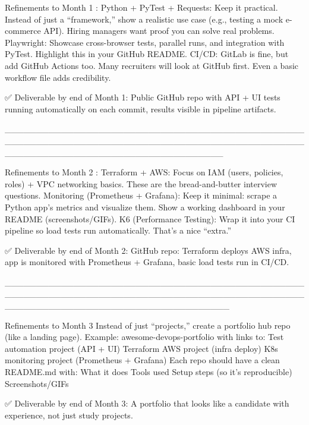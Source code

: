 Refinements to Month 1 :
Python + PyTest + Requests: Keep it practical. Instead of just a “framework,” show a realistic use case (e.g., testing a mock e-commerce API). Hiring managers want proof you can solve real problems.
Playwright: Showcase cross-browser tests, parallel runs, and integration with PyTest. Highlight this in your GitHub README.
CI/CD: GitLab is fine, but add GitHub Actions too. Many recruiters will look at GitHub first. Even a basic workflow file adds credibility.

✅ Deliverable by end of Month 1: Public GitHub repo with API + UI tests running automatically on each commit, results visible in pipeline artifacts.

___________________________________________________________________________________________________________________________________

Refinements to Month 2 :
Terraform + AWS: Focus on IAM (users, policies, roles) + VPC networking basics. These are the bread-and-butter interview questions.
Monitoring (Prometheus + Grafana): Keep it minimal: scrape a Python app’s metrics and visualize them. Show a working dashboard in your README (screenshots/GIFs).
K6 (Performance Testing): Wrap it into your CI pipeline so load tests run automatically. That’s a nice “extra.”

✅ Deliverable by end of Month 2: GitHub repo: Terraform deploys AWS infra, app is monitored with Prometheus + Grafana, basic load tests run in CI/CD.

____________________________________________________________________________________________________________________________________

Refinements to Month 3
Instead of just “projects,” create a portfolio hub repo (like a landing page). Example: awesome-devops-portfolio with links to:
Test automation project (API + UI)
Terraform AWS project (infra deploy)
K8s monitoring project (Prometheus + Grafana)
Each repo should have a clean README.md with:
What it does
Tools used
Setup steps (so it’s reproducible)
Screenshots/GIFs

✅ Deliverable by end of Month 3: A portfolio that looks like a candidate with experience, not just study projects.